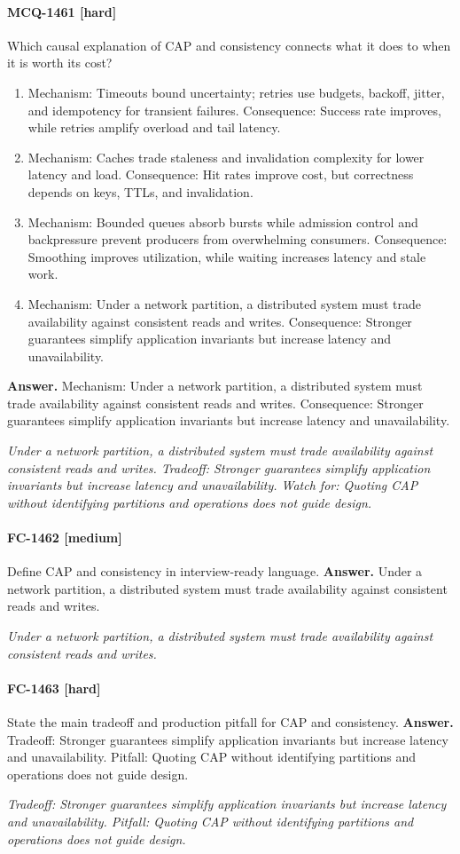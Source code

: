 \paragraph{MCQ-1461 [hard]} Which causal explanation of CAP and consistency connects what it does to when it is worth its cost?
\begin{enumerate}[label=\Alph*.]
\item Mechanism: Timeouts bound uncertainty; retries use budgets, backoff, jitter, and idempotency for transient failures. Consequence: Success rate improves, while retries amplify overload and tail latency.
\item Mechanism: Caches trade staleness and invalidation complexity for lower latency and load. Consequence: Hit rates improve cost, but correctness depends on keys, TTLs, and invalidation.
\item Mechanism: Bounded queues absorb bursts while admission control and backpressure prevent producers from overwhelming consumers. Consequence: Smoothing improves utilization, while waiting increases latency and stale work.
\item Mechanism: Under a network partition, a distributed system must trade availability against consistent reads and writes. Consequence: Stronger guarantees simplify application invariants but increase latency and unavailability.
\end{enumerate}
\noindent\textbf{Answer.} Mechanism: Under a network partition, a distributed system must trade availability against consistent reads and writes. Consequence: Stronger guarantees simplify application invariants but increase latency and unavailability.
\par\textit{Under a network partition, a distributed system must trade availability against consistent reads and writes. Tradeoff: Stronger guarantees simplify application invariants but increase latency and unavailability. Watch for: Quoting CAP without identifying partitions and operations does not guide design.}
\paragraph{FC-1462 [medium]} Define CAP and consistency in interview-ready language.
\noindent\textbf{Answer.} Under a network partition, a distributed system must trade availability against consistent reads and writes.
\par\textit{Under a network partition, a distributed system must trade availability against consistent reads and writes.}
\paragraph{FC-1463 [hard]} State the main tradeoff and production pitfall for CAP and consistency.
\noindent\textbf{Answer.} Tradeoff: Stronger guarantees simplify application invariants but increase latency and unavailability. Pitfall: Quoting CAP without identifying partitions and operations does not guide design.
\par\textit{Tradeoff: Stronger guarantees simplify application invariants but increase latency and unavailability. Pitfall: Quoting CAP without identifying partitions and operations does not guide design.}
